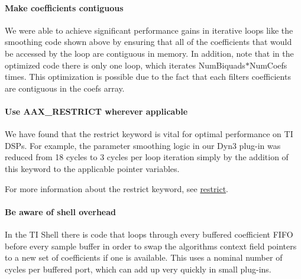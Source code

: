 \hypertarget{a00832_subsubsection__make_coefficients_contiguous_}{}\paragraph{Make coefficients contiguous}\label{a00832_subsubsection__make_coefficients_contiguous_}
 We were able to achieve significant performance gains in iterative loops like the smoothing code shown above by ensuring that all of the coefficients that would be accessed by the loop are contiguous in memory. In addition, note that in the optimized code there is only one loop, which iterates {\ttfamily Num\+Biquads$\ast$\+Num\+Coefs} times. This optimization is possible due to the fact that each filter\textquotesingle{}s coefficients are contiguous in the {\ttfamily coefs} array.

\hypertarget{a00832_subsubsection__use_aax_restrict_wherever_applicable_}{}\paragraph{Use A\+A\+X\+\_\+\+R\+E\+S\+T\+R\+I\+C\+T wherever applicable}\label{a00832_subsubsection__use_aax_restrict_wherever_applicable_}
 We have found that the {\ttfamily restrict} keyword is vital for optimal performance on TI D\+S\+Ps. For example, the parameter smoothing logic in our Dyn3 plug-\/in was reduced from 18 cycles to 3 cycles per loop iteration simply by the addition of this keyword to the applicable pointer variables.

For more information about the {\ttfamily restrict} keyword, see \mbox{\hyperlink{a00832_subsubsection__restrict_}{restrict}}.

\hypertarget{a00832_subsubsection__be_aware_of_shell_overhead_}{}\paragraph{Be aware of shell overhead}\label{a00832_subsubsection__be_aware_of_shell_overhead_}
 In the TI Shell there is code that loops through every buffered coefficient F\+I\+FO before every sample buffer in order to swap the algorithm\textquotesingle{}s context field pointers to a new set of coefficients if one is available. This uses a nominal number of cycles per buffered port, which can add up very quickly in small plug-\/ins.

